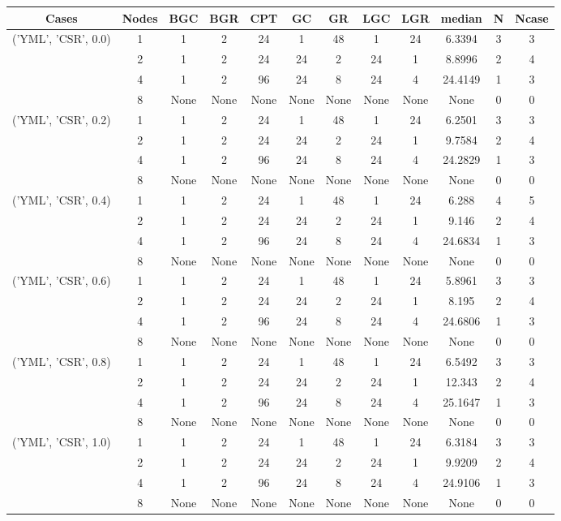 \begin{tabular}{cccccccccccc}
\hline
Cases & Nodes& BGC& BGR& CPT& GC& GR& LGC& LGR& median & N & Ncase \\
\hline
\multirow{4}{*}{('YML', 'CSR', 0.0)}& 1& 1& 2& 24& 1& 48& 1& 24& 6.3394& 3& 3\\
& 2& 1& 2& 24& 24& 2& 24& 1& 8.8996& 2& 4\\
& 4& 1& 2& 96& 24& 8& 24& 4& 24.4149& 1& 3\\
& 8& None& None& None& None& None& None& None& None& 0& 0\\
\hline
\multirow{4}{*}{('YML', 'CSR', 0.2)}& 1& 1& 2& 24& 1& 48& 1& 24& 6.2501& 3& 3\\
& 2& 1& 2& 24& 24& 2& 24& 1& 9.7584& 2& 4\\
& 4& 1& 2& 96& 24& 8& 24& 4& 24.2829& 1& 3\\
& 8& None& None& None& None& None& None& None& None& 0& 0\\
\hline
\multirow{4}{*}{('YML', 'CSR', 0.4)}& 1& 1& 2& 24& 1& 48& 1& 24& 6.288& 4& 5\\
& 2& 1& 2& 24& 24& 2& 24& 1& 9.146& 2& 4\\
& 4& 1& 2& 96& 24& 8& 24& 4& 24.6834& 1& 3\\
& 8& None& None& None& None& None& None& None& None& 0& 0\\
\hline
\multirow{4}{*}{('YML', 'CSR', 0.6)}& 1& 1& 2& 24& 1& 48& 1& 24& 5.8961& 3& 3\\
& 2& 1& 2& 24& 24& 2& 24& 1& 8.195& 2& 4\\
& 4& 1& 2& 96& 24& 8& 24& 4& 24.6806& 1& 3\\
& 8& None& None& None& None& None& None& None& None& 0& 0\\
\hline
\multirow{4}{*}{('YML', 'CSR', 0.8)}& 1& 1& 2& 24& 1& 48& 1& 24& 6.5492& 3& 3\\
& 2& 1& 2& 24& 24& 2& 24& 1& 12.343& 2& 4\\
& 4& 1& 2& 96& 24& 8& 24& 4& 25.1647& 1& 3\\
& 8& None& None& None& None& None& None& None& None& 0& 0\\
\hline
\multirow{4}{*}{('YML', 'CSR', 1.0)}& 1& 1& 2& 24& 1& 48& 1& 24& 6.3184& 3& 3\\
& 2& 1& 2& 24& 24& 2& 24& 1& 9.9209& 2& 4\\
& 4& 1& 2& 96& 24& 8& 24& 4& 24.9106& 1& 3\\
& 8& None& None& None& None& None& None& None& None& 0& 0\\
\hline
\end{tabular}



